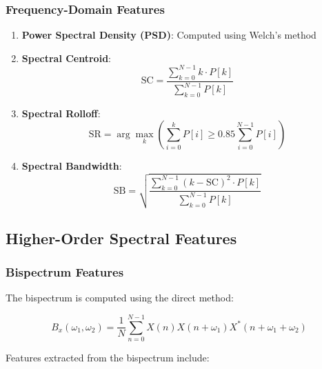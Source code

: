 \subsubsection{Frequency-Domain Features}

\begin{enumerate}
    \item \textbf{Power Spectral Density (PSD)}: Computed using Welch's method
    \item \textbf{Spectral Centroid}:
    \begin{equation}
    \text{SC} = \frac{\sum_{k=0}^{N-1} k \cdot P[k]}{\sum_{k=0}^{N-1} P[k]}
    \end{equation}
    
    \item \textbf{Spectral Rolloff}:
    \begin{equation}
    \text{SR} = \arg\max_k \left(\sum_{i=0}^{k} P[i] \geq 0.85 \sum_{i=0}^{N-1} P[i]\right)
    \end{equation}
    
    \item \textbf{Spectral Bandwidth}:
    \begin{equation}
    \text{SB} = \sqrt{\frac{\sum_{k=0}^{N-1} (k - \text{SC})^2 \cdot P[k]}{\sum_{k=0}^{N-1} P[k]}}
    \end{equation}
\end{enumerate}

\subsection{Higher-Order Spectral Features}

\subsubsection{Bispectrum Features}

The bispectrum is computed using the direct method:

\begin{equation}
B_x(\omega_1, \omega_2) = \frac{1}{N} \sum_{n=0}^{N-1} X(n)X(n+\omega_1)X^*(n+\omega_1+\omega_2)
\end{equation}

Features extracted from the bispectrum include:

